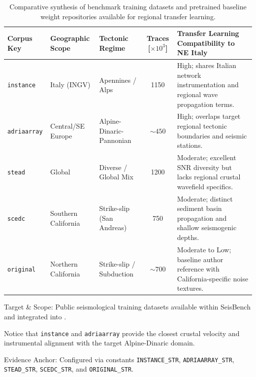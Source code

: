 \begin{table}[htbp]
  \centering
  \small
  \caption{Comparative synthesis of benchmark training datasets and pretrained
  baseline weight repositories available for regional transfer learning.}
  \label{tab:pretrained_corpora_comparison}
  \begin{threeparttable}
    \begin{tabularx}{\linewidth}{l l l c >{\raggedright\arraybackslash}X}
      \toprule
      \textbf{Corpus Key} & \textbf{Geographic Scope} &
      \textbf{Tectonic Regime} & \textbf{Traces [$\times 10^3$]} &
      \textbf{Transfer Learning Compatibility to NE Italy} \\
      \midrule
      \texttt{instance}   & Italy (\ac{INGV})         & Apennines /
      Alps         & \num{1150}                 & High; shares
      Italian network instrumentation and regional wave propagation terms. \\
      \texttt{adriaarray} & Central/SE Europe         &
      Alpine-Dinaric-Pannonian & $\sim \num{450}$                & High;
      overlaps target regional tectonic boundaries and seismic stations. \\
      \texttt{stead}      & Global                    & Diverse /
      Global Mix     & \num{1200}                 & Moderate;
      excellent \ac{SNR} diversity but lacks regional crustal wavefield
      specifics. \\
      \texttt{scedc}      & Southern California       & Strike-slip
      (San Andreas)& \num{750}                     & Moderate; distinct
      sediment basin propagation and shallow seismogenic depths. \\
      \texttt{original}   & Northern California       & Strike-slip
      / Subduction & $\sim \num{700}$                & Moderate to Low;
      baseline author reference with California-specific noise textures. \\
      \bottomrule
    \end{tabularx}
    \begin{tablenotes}[flushleft]
      \footnotesize
    \item Target \& Scope: Public seismological training datasets
      available within
      SeisBench \parencite{SeisBench} and integrated into
      .
    \item Notice that \texttt{instance} and \texttt{adriaarray}
      provide the closest
      crustal velocity and instrumental alignment with the target
      Alpine-Dinaric domain.
    \item Evidence Anchor: Configured via
       constants
      \texttt{INSTANCE\_STR}, \texttt{ADRIAARRAY\_STR}, \texttt{STEAD\_STR},
      \texttt{SCEDC\_STR}, and \texttt{ORIGINAL\_STR}.
    \end{tablenotes}
  \end{threeparttable}
\end{table}

